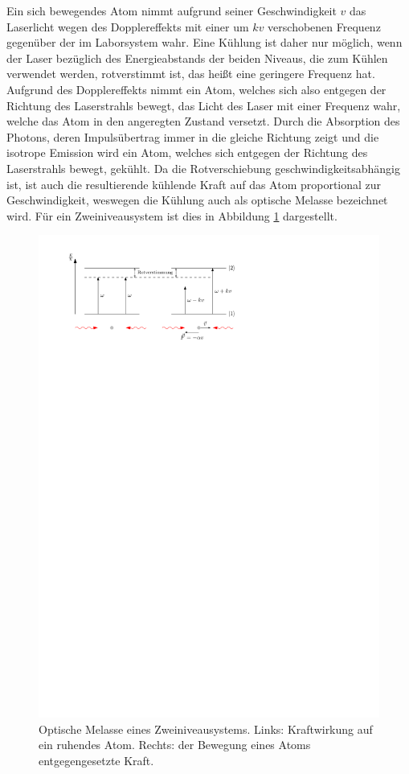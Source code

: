 \documentclass[11pt, a4paper]{article}
\numberwithin{equation}{section}
\begin{document}
Ein sich bewegendes Atom nimmt aufgrund seiner Geschwindigkeit $v$ das Laserlicht wegen des Dopplereffekts mit einer um $kv$ verschobenen Frequenz gegenüber der im Laborsystem wahr.
Eine Kühlung ist daher nur möglich, wenn der Laser bezüglich des Energieabstands der beiden Niveaus, die zum Kühlen verwendet werden, rotverstimmt ist, das heißt eine geringere Frequenz hat.
Aufgrund des Dopplereffekts nimmt ein Atom, welches sich also entgegen der Richtung des Laserstrahls bewegt, das Licht des Laser mit einer Frequenz wahr, welche das Atom in den angeregten Zustand versetzt.
Durch die Absorption des Photons, deren Impulsübertrag immer in die gleiche Richtung zeigt und die isotrope Emission wird ein Atom, welches sich entgegen der Richtung des Laserstrahls bewegt, gekühlt.
Da die Rotverschiebung geschwindigkeitsabhängig ist, ist auch die resultierende kühlende Kraft auf das Atom proportional zur Geschwindigkeit, weswegen die Kühlung auch als optische Melasse bezeichnet wird.
Für ein Zweiniveausystem ist dies in Abbildung \ref{fig:opt_melasse} dargestellt.
\begin{figure}[h]
	\centering
	\includegraphics[width=.8\textwidth]{./figures/theory/melasse}
	\caption{Optische Melasse eines Zweiniveausystems. Links: Kraftwirkung auf ein ruhendes Atom. Rechts: der Bewegung eines Atoms entgegengesetzte Kraft.}
	\label{fig:opt_melasse}
\end{figure}
\end{document}
